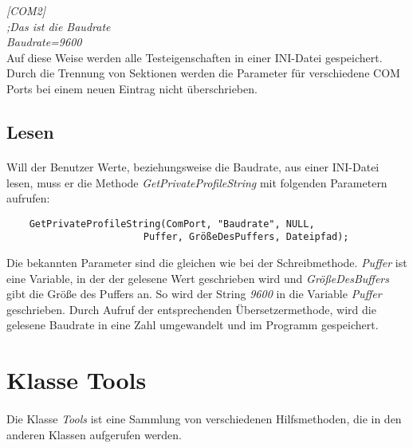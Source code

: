 \hspace*{20mm}\textit{[COM2]}    \\
\hspace*{20mm}\textit{;Das ist die Baudrate}    \\
\hspace*{20mm}\textit{Baudrate=9600}\\

Auf diese Weise werden alle Testeigenschaften in einer INI-Datei gespeichert. Durch die Trennung von Sektionen werden die Parameter für verschiedene COM Ports bei einem neuen Eintrag nicht überschrieben.


\subsection{Lesen}
\paragraph{}
Will der Benutzer Werte, beziehungsweise die Baudrate, aus einer INI-Datei lesen, muss er die Methode \textit{GetPrivateProfileString} mit folgenden Parametern aufrufen:\\

\begin{lstlisting}
	GetPrivateProfileString(ComPort, "Baudrate", NULL,
                        Puffer, GrößeDesPuffers, Dateipfad);
\end{lstlisting}

Die bekannten Parameter sind die gleichen wie bei der Schreibmethode. \textit{Puffer} ist eine Variable, in der der gelesene Wert geschrieben wird und \textit{GrößeDesBuffers} gibt die Größe des Puffers an. So wird der String \textit{9600} in die Variable \textit{Puffer} geschrieben. Durch Aufruf der entsprechenden Übersetzermethode, wird die gelesene Baudrate in eine Zahl umgewandelt und im Programm gespeichert.


\newpage

\section{Klasse Tools}
\paragraph{}
Die Klasse \textit{Tools} ist eine Sammlung von verschiedenen Hilfsmethoden, die in den anderen Klassen aufgerufen werden.

